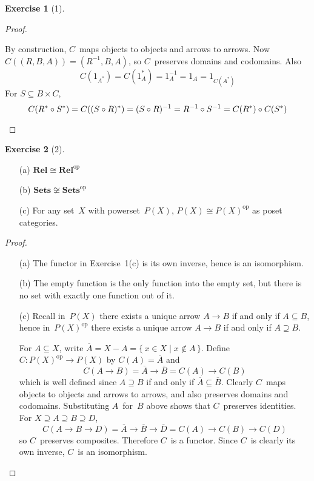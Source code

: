 \documentclass[letterpaper,12pt]{article}
\newcommand{\iso}{\cong}
\newcommand{\after}{\circ}
\newcommand{\comp}[1]{\overline{#1}}
\newcommand{\inv}[1]{#1^{-1}}
\renewcommand{\star}[1]{#1^{*}}
\newcommand{\cat}[1]{\mathbf{#1}}
\newcommand{\dual}[1]{#1^{\mathrm{op}}}
\newcommand{\Rel}{\cat{Rel}}
\newcommand{\Relop}{\dual{\Rel}}
\newcommand{\Sets}{\cat{Sets}}
\newcommand{\Setsop}{\dual{\Sets}}
\theoremstyle{definition}
\newtheorem*{exer}{Exercise}
\theoremstyle{remark}
\theoremstyle{direction}
\begin{document}
\begin{exer}[1]
\begin{proof}
\begin{enumerate}[itemsep=0pt]
By construction, \(C\)~maps objects to objects and arrows to arrows. Now \(C((R,B,A))=(\inv{R},B,A)\), so \(C\)~preserves domains and codomains. Also
\[C(1_{\star{A}})=C(\star{1_A})=\inv{1_A}=1_A=1_{C(\star{A})}\]
For \(S\subseteq B\times C\),
\[C(\star{R}\after\star{S})=C(\star{(S\after R)})=\inv{(S\after R)}=\inv{R}\after\inv{S}=C(\star{R})\after C(\star{S})\qedhere\]
\end{enumerate}
\end{proof}
\end{exer}

\begin{exer}[2]\
\begin{enumerate}[itemsep=0pt]
\item[(a)] \(\Rel\iso\Relop\)
\item[(b)] \(\Sets\not\iso\Setsop\)
\item[(c)] For any set~\(X\) with powerset~\(P(X)\), \(P(X)\iso\dual{P(X)}\) as poset categories.
\end{enumerate}
\begin{proof}\
\begin{enumerate}[itemsep=0pt]
\item[(a)] The functor in Exercise~1(c) is its own inverse, hence is an isomorphism.
\item[(b)] The empty function is the only function into the empty set, but there is no set with exactly one function out of it.
\item[(c)] Recall in~\(P(X)\) there exists a unique arrow \(A\to B\) if and only if \(A\subseteq B\), hence in~\(\dual{P(X)}\) there exists a unique arrow \(A\to B\) if and only if \(A\supseteq B\).

For \(A\subseteq X\), write \(\comp{A}=X-A=\{\,x\in X\mid x\not\in A\,\}\). Define \(C:\dual{P(X)}\to P(X)\) by \(C(A)=\comp{A}\) and
\[C(A\to B)=\comp{A}\to\comp{B}=C(A)\to C(B)\]
which is well defined since \(A\supseteq B\) if and only if \(\comp{A}\subseteq\comp{B}\). Clearly \(C\)~maps objects to objects and arrows to arrows, and also preserves domains and codomains. Substituting \(A\)~for~\(B\) above shows that \(C\)~preserves identities. For \(X\supseteq A\supseteq B\supseteq D\),
\[C(A\to B\to D)=\comp{A}\to\comp{B}\to\comp{D}=C(A)\to C(B)\to C(D)\]
so \(C\)~preserves composites. Therefore \(C\)~is a functor. Since \(C\)~is clearly its own inverse, \(C\)~is an isomorphism.\qedhere
\end{enumerate}
\end{proof}
\end{exer}
\end{document}
